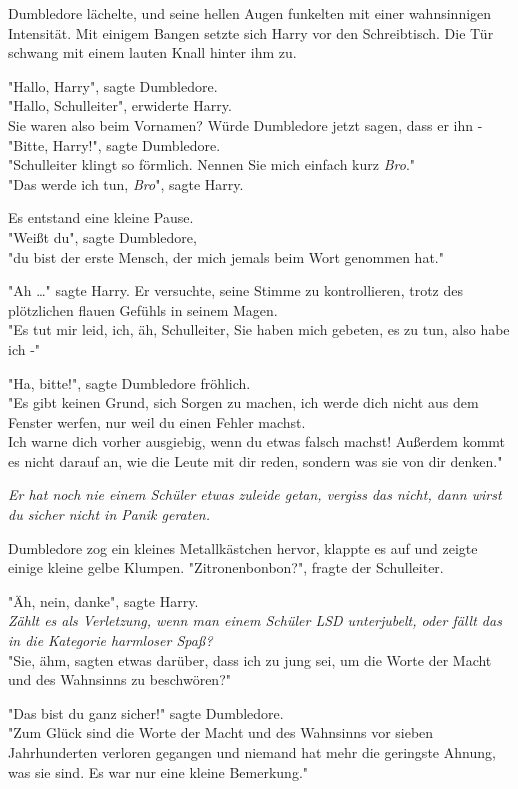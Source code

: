 {Dumbledore lächelte, und seine hellen Augen funkelten mit einer wahnsinnigen Intensität. Mit einigem Bangen setzte sich Harry vor den Schreibtisch. Die Tür schwang mit einem lauten Knall hinter ihm zu.

"Hallo, Harry", sagte Dumbledore.\\ "Hallo, Schulleiter", erwiderte Harry.\\ Sie waren also beim Vornamen? Würde Dumbledore jetzt sagen, dass er ihn -\\ "Bitte, Harry!", sagte Dumbledore.\\ "Schulleiter klingt so förmlich. Nennen Sie mich einfach kurz \emph{Bro}."\\ "Das werde ich tun, \emph{Bro}", sagte Harry.

Es entstand eine kleine Pause.\\ "Weißt du", sagte Dumbledore,\\ "du bist der erste Mensch, der mich jemals beim Wort genommen hat."

"Ah …" sagte Harry. Er versuchte, seine Stimme zu kontrollieren, trotz des plötzlichen flauen Gefühls in seinem Magen.\\ "Es tut mir leid, ich, äh, Schulleiter, Sie haben mich gebeten, es zu tun, also habe ich -"

"Ha, bitte!", sagte Dumbledore fröhlich.\\ "Es gibt keinen Grund, sich Sorgen zu machen, ich werde dich nicht aus dem Fenster werfen, nur weil du einen Fehler machst.\\ Ich warne dich vorher ausgiebig, wenn du etwas falsch machst! Außerdem kommt es nicht darauf an, wie die Leute mit dir reden, sondern was sie von dir denken."

\emph{Er hat noch nie einem Schüler etwas zuleide getan, vergiss das nicht, dann wirst du sicher nicht in Panik geraten.}

Dumbledore zog ein kleines Metallkästchen hervor, klappte es auf und zeigte einige kleine gelbe Klumpen. "Zitronenbonbon?", fragte der Schulleiter.

"Äh, nein, danke", sagte Harry.\\ \emph{Zählt es als Verletzung, wenn man einem Schüler LSD unterjubelt, oder fällt das in die Kategorie harmloser Spaß?}\\ "Sie, ähm, sagten etwas darüber, dass ich zu jung sei, um die Worte der Macht und des Wahnsinns zu beschwören?"

"Das bist du ganz sicher!" sagte Dumbledore.\\ "Zum Glück sind die Worte der Macht und des Wahnsinns vor sieben Jahrhunderten verloren gegangen und niemand hat mehr die geringste Ahnung, was sie sind. Es war nur eine kleine Bemerkung."

}
